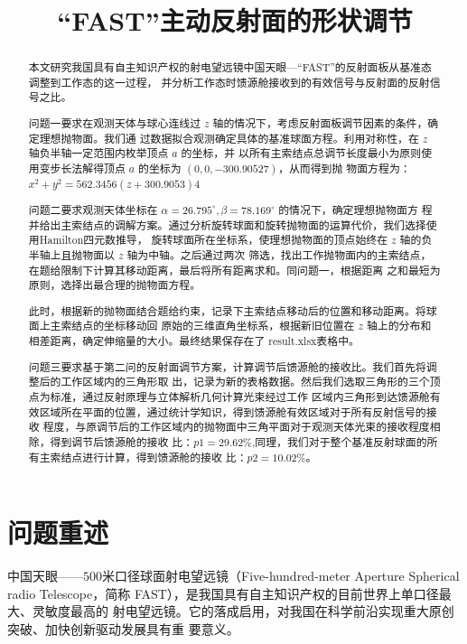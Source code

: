 \documentclass[withoutpreface,bwprint]{cumcmthesis} %
\title{“FAST”主动反射面的形状调节}
\begin{document}
\maketitle
\begin{abstract}
本文研究我国具有自主知识产权的射电望远镜中国天眼---“FAST”的反射面板从基准态调整到工作态的这一过程，
并分析工作态时馈源舱接收到的有效信号与反射面的反射信号之比。

问题一要求在观测天体与球心连线过 $z$ 轴的情况下，考虑反射面板调节因素的条件，确定理想抛物面。我们通
过数据拟合观测确定具体的基准球面方程。利用对称性，在 $z$ 轴负半轴一定范围内枚举顶点 $a$ 的坐标，并
以所有主索结点总调节长度最小为原则使用变步长法解得顶点 $a$ 的坐标为 $(0,0,-300.90527)$，从而得到抛
物面方程为：$x^2+y^2=562.3456(z+300.9053)4$

问题二要求观测天体坐标在 $\alpha =26.795^\circ,\beta =78.169^\circ$ 的情况下，确定理想抛物面方
程并给出主索结点的调解方案。通过分析旋转球面和旋转抛物面的运算代价，我们选择使用Hamilton四元数推导，
旋转球面所在坐标系，使理想抛物面的顶点始终在 $z$ 轴的负半轴上且抛物面以 $z$ 轴为中轴。之后通过两次
筛选，找出工作抛物面内的主索结点，在题给限制下计算其移动距离，最后将所有距离求和。同问题一，根据距离
之和最短为原则，选择出最合理的抛物面方程。

此时，根据新的抛物面结合题给约束，记录下主索结点移动后的位置和移动距离。将球面上主索结点的坐标移动回
原始的三维直角坐标系，根据新旧位置在 $z$ 轴上的分布和相差距离，确定伸缩量的大小。最终结果保存在了
result.xlsx表格中。

问题三要求基于第二问的反射面调节方案，计算调节后馈源舱的接收比。我们首先将调整后的工作区域内的三角形取
出，记录为新的表格数据。然后我们选取三角形的三个顶点为标准，通过反射原理与立体解析几何计算光束经过工作
区域内三角形到达馈源舱有效区域所在平面的位置，通过统计学知识，得到馈源舱有效区域对于所有反射信号的接收
程度，与原调节后的工作区域内的抛物面中三角平面对于观测天体光束的接收程度相除，得到调节后馈源舱的接收
比：$p1 = 29.62\%$,同理，我们对于整个基准反射球面的所有主索结点进行计算，得到馈源舱的接收
比：$p2 = 10.02\%$。

\end{abstract}



\section{问题重述}
中国天眼——$500$米口径球面射电望远镜（Five-hundred-meter Aperture Spherical radio
Telescope，简称 FAST），是我国具有自主知识产权的目前世界上单口径最大、灵敏度最高的
射电望远镜。它的落成启用，对我国在科学前沿实现重大原创突破、加快创新驱动发展具有重
要意义。
\end{document}
